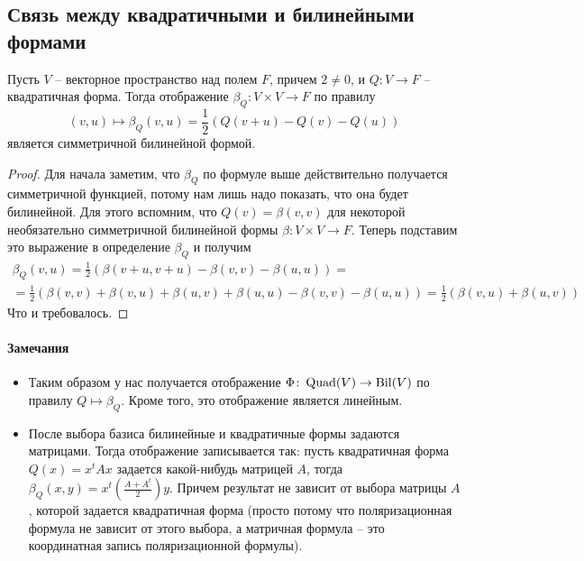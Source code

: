 \subsection{Связь между квадратичными и билинейными формами}


\begin{claim}
Пусть $V$ -- векторное пространство над полем $F$, причем $2 \neq 0$, и $Q\colon V\to F$ -- квадратичная форма. Тогда отображение $\beta_Q\colon V\times V\to F$ по правилу 
\[
(v,u)\mapsto \beta_Q(v, u) = \frac{1}{2}\left(Q(v+u) - Q(v) - Q(u)\right)
\]
является симметричной билинейной формой.
\end{claim}
\begin{proof}
Для начала заметим, что $\beta_Q$ по формуле выше действительно получается симметричной функцией, потому нам лишь надо показать, что она будет билинейной. Для этого вспомним, что $Q(v) = \beta(v, v)$ для некоторой необязательно симметричной билинейной формы $\beta\colon V\times V\to F$. Теперь подставим это выражение в определение $\beta_Q$ и получим
\begin{gather*}
\beta_Q(v, u) = \frac{1}{2}\left(\beta(v + u, v + u) - \beta(v, v) - \beta(u, u)\right) =\\
= \frac{1}{2}\left(\beta(v,v) + \beta(v, u) + \beta(u, v) + \beta(u,u)- \beta(v, v) - \beta(u, u)\right) = \frac{1}{2}\left(\beta(v, u) + \beta(u, v) \right)
\end{gather*}
Что и требовалось.
\end{proof}

\paragraph{Замечания}
\begin{itemize}
\item Таким образом у нас получается отображение $\Phi\colon\operatorname{Quad}(V) \to \operatorname{Bil}(V)$ по правилу $Q\mapsto \beta_Q$. Кроме того, это отображение является линейным.
\item После выбора базиса билинейные и квадратичные формы задаются матрицами. Тогда отображение записывается так: пусть квадратичная форма $Q(x) = x^t A x$ задается какой-нибудь матрицей $A$, тогда $\beta_Q(x, y) = x^t \left(\frac{A + A^t}{2}\right) y$. Причем результат не зависит от выбора матрицы $A$, которой задается квадратичная форма (просто потому что поляризационная формула не зависит от этого выбора, а матричная формула -- это координатная запись поляризационной формулы).
\end{itemize}


